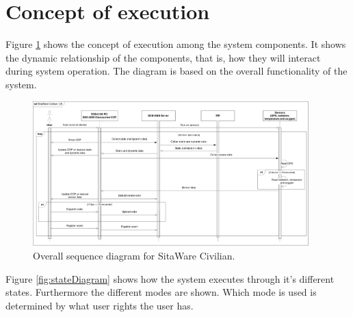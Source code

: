 \section{Concept of execution}

Figure \ref{fig:sekvens1} shows the concept of execution among the system components. It shows the dynamic relationship of the components, that is, how they will interact during system operation. The diagram is based on the overall functionality of the system. 


\begin{figure}[H]
\centering
\includegraphics[width=0.95\textwidth]
{billeder/sekvens1.pdf}
\caption{Overall sequence diagram for SitaWare Civilian.}
\label{fig:sekvens1}
\end{figure}

Figure \ref{fig:stateDiagram} shows how the system executes through it's different states. Furthermore the different modes are shown. Which mode is used is determined by what user rights the user has.

